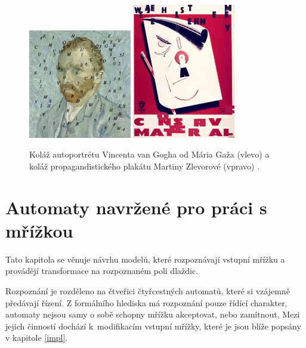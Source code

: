 \begin{figure}[H]
    \centering
    \includegraphics[width=0.4\textwidth]{obrazky-figures/GazoKolaz.jpg}
    \hspace{0.1\textwidth}
    \includegraphics[width=0.4\textwidth]{obrazky-figures/ZlevorovaKolaz.jpg}
    \caption{Koláž autoportrétu Vincenta van Gogha od Mária Gaža (vlevo) \cite{GazoBak} a koláž propagandistického plakátu Martiny Zlevorové (vpravo) \cite{ZlevorovaBak}.}
    \label{fig:CAKolaze}
\end{figure}

\chapter{Automaty navržené pro práci s mřížkou} 
\label{newAutomata}

Tato kapitola se věnuje návrhu modelů, které rozpoznávají vstupní mřížku a provádějí transformace na rozpoznaném poli dlaždic. 

Rozpoznání je rozděleno na čtveřici čtyřcestných automatů, které si vzájemně předávají řízení. Z formálního hlediska má rozpoznání pouze řídící charakter, automaty nejsou samy o sobě schopny mřížku akceptovat, nebo zamítnout, Mezi jejich činností dochází k~modifikacím vstupní mřížky, které je jsou blíže popsány v kapitole \ref{impl}.

